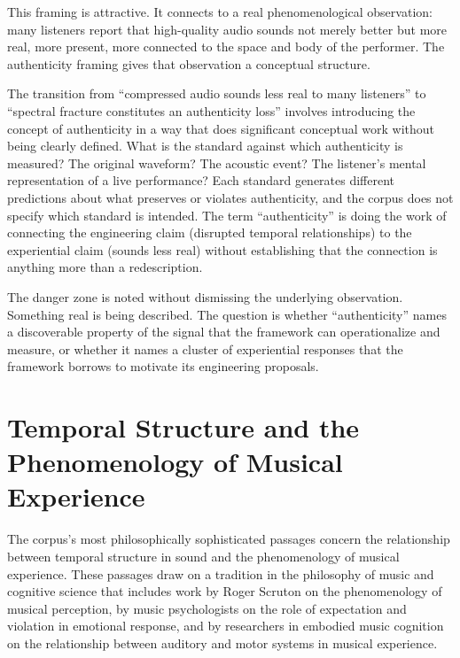 This framing is attractive. It connects to a real phenomenological
observation: many listeners report that high-quality audio sounds
not merely better but more real, more present, more connected
to the space and body of the performer. The authenticity framing
gives that observation a conceptual structure.

\begin{dangerzone}
The transition from ``compressed audio sounds less real to many
listeners'' to ``spectral fracture constitutes an authenticity
loss'' involves introducing the concept of authenticity in a
way that does significant conceptual work without being clearly
defined. What is the standard against which authenticity is
measured? The original waveform? The acoustic event? The listener's
mental representation of a live performance? Each standard
generates different predictions about what preserves or violates
authenticity, and the corpus does not specify which standard
is intended. The term ``authenticity'' is doing the work of
connecting the engineering claim (disrupted temporal relationships)
to the experiential claim (sounds less real) without establishing
that the connection is anything more than a redescription.
\end{dangerzone}

The danger zone is noted without dismissing the underlying
observation. Something real is being described. The question
is whether ``authenticity'' names a discoverable property of
the signal that the framework can operationalize and measure,
or whether it names a cluster of experiential responses that
the framework borrows to motivate its engineering proposals.

\section{Temporal Structure and the Phenomenology of Musical Experience}
\label{sec:temporal-phenomenology}

The corpus's most philosophically sophisticated passages
concern the relationship between temporal structure in sound
and the phenomenology of musical experience. These passages
draw on a tradition in the philosophy of music and cognitive
science that includes work by Roger Scruton on the phenomenology
of musical perception, by music psychologists on the role of
expectation and violation in emotional response, and by
researchers in embodied music cognition on the relationship
between auditory and motor systems in musical experience.

